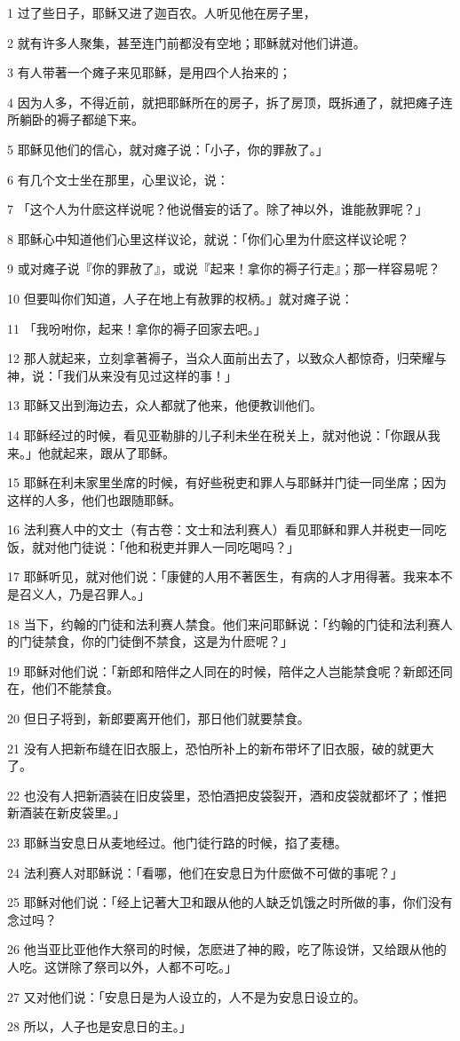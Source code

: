 \par 1 过了些日子，耶稣又进了迦百农。人听见他在房子里，
\par 2 就有许多人聚集，甚至连门前都没有空地；耶稣就对他们讲道。
\par 3 有人带著一个瘫子来见耶稣，是用四个人抬来的；
\par 4 因为人多，不得近前，就把耶稣所在的房子，拆了房顶，既拆通了，就把瘫子连所躺卧的褥子都缒下来。
\par 5 耶稣见他们的信心，就对瘫子说：「小子，你的罪赦了。」
\par 6 有几个文士坐在那里，心里议论，说：
\par 7 「这个人为什麽这样说呢？他说僭妄的话了。除了神以外，谁能赦罪呢？」
\par 8 耶稣心中知道他们心里这样议论，就说：「你们心里为什麽这样议论呢？
\par 9 或对瘫子说『你的罪赦了』，或说『起来！拿你的褥子行走』；那一样容易呢？
\par 10 但要叫你们知道，人子在地上有赦罪的权柄。」就对瘫子说：
\par 11 「我吩咐你，起来！拿你的褥子回家去吧。」
\par 12 那人就起来，立刻拿著褥子，当众人面前出去了，以致众人都惊奇，归荣耀与神，说：「我们从来没有见过这样的事！」
\par 13 耶稣又出到海边去，众人都就了他来，他便教训他们。
\par 14 耶稣经过的时候，看见亚勒腓的儿子利未坐在税关上，就对他说：「你跟从我来。」他就起来，跟从了耶稣。
\par 15 耶稣在利未家里坐席的时候，有好些税吏和罪人与耶稣并门徒一同坐席；因为这样的人多，他们也跟随耶稣。
\par 16 法利赛人中的文士（有古卷：文士和法利赛人）看见耶稣和罪人并税吏一同吃饭，就对他门徒说：「他和税吏并罪人一同吃喝吗？」
\par 17 耶稣听见，就对他们说：「康健的人用不著医生，有病的人才用得著。我来本不是召义人，乃是召罪人。」
\par 18 当下，约翰的门徒和法利赛人禁食。他们来问耶稣说：「约翰的门徒和法利赛人的门徒禁食，你的门徒倒不禁食，这是为什麽呢？」
\par 19 耶稣对他们说：「新郎和陪伴之人同在的时候，陪伴之人岂能禁食呢？新郎还同在，他们不能禁食。
\par 20 但日子将到，新郎要离开他们，那日他们就要禁食。
\par 21 没有人把新布缝在旧衣服上，恐怕所补上的新布带坏了旧衣服，破的就更大了。
\par 22 也没有人把新酒装在旧皮袋里，恐怕酒把皮袋裂开，酒和皮袋就都坏了；惟把新酒装在新皮袋里。」
\par 23 耶稣当安息日从麦地经过。他门徒行路的时候，掐了麦穗。
\par 24 法利赛人对耶稣说：「看哪，他们在安息日为什麽做不可做的事呢？」
\par 25 耶稣对他们说：「经上记著大卫和跟从他的人缺乏饥饿之时所做的事，你们没有念过吗？
\par 26 他当亚比亚他作大祭司的时候，怎麽进了神的殿，吃了陈设饼，又给跟从他的人吃。这饼除了祭司以外，人都不可吃。」
\par 27 又对他们说：「安息日是为人设立的，人不是为安息日设立的。
\par 28 所以，人子也是安息日的主。」

